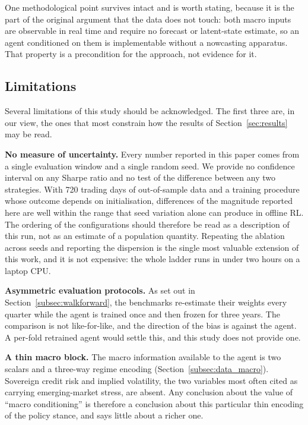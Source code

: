 One methodological point survives intact and is worth stating, because it is the
part of the original argument that the data does not touch: both macro inputs are
observable in real time and require no forecast or latent-state estimate, so an
agent conditioned on them is implementable without a nowcasting apparatus.
That property is a precondition for the approach, not evidence for it.

\subsection{Limitations}
\label{subsec:disc_limitations}

Several limitations of this study should be acknowledged.
The first three are, in our view, the ones that most constrain how the results
of Section~\ref{sec:results} may be read.

\textbf{No measure of uncertainty.}
Every number reported in this paper comes from a single evaluation window and a
single random seed.
We provide no confidence interval on any Sharpe ratio and no test of the
difference between any two strategies.
With 720 trading days of out-of-sample data and a training procedure whose
outcome depends on initialisation, differences of the magnitude reported here
are well within the range that seed variation alone can produce in offline RL.
The ordering of the configurations should therefore be read as a description of
this run, not as an estimate of a population quantity.
Repeating the ablation across seeds and reporting the dispersion is the single
most valuable extension of this work, and it is not expensive: the whole ladder
runs in under two hours on a laptop CPU.

\textbf{Asymmetric evaluation protocols.}
As set out in Section~\ref{subsec:walkforward}, the benchmarks re-estimate their
weights every quarter while the agent is trained once and then frozen for three
years.
The comparison is not like-for-like, and the direction of the bias is against
the agent.
A per-fold retrained agent would settle this, and this study does not provide one.

\textbf{A thin macro block.}
The macro information available to the agent is two scalars and a three-way
regime encoding (Section~\ref{subsec:data_macro}).
Sovereign credit risk and implied volatility, the two variables most often cited
as carrying emerging-market stress, are absent.
Any conclusion about the value of ``macro conditioning'' is therefore a
conclusion about this particular thin encoding of the policy stance, and says
little about a richer one.

